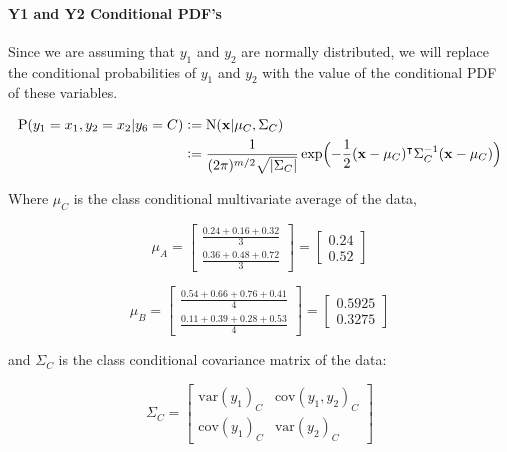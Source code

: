 \documentclass[12pt]{article}
\begin{document}
\begin{enumerate}[leftmargin=\labelsep]
\begin{enumerate}
        \paragraph{Y1 and Y2 Conditional PDF's}
        Since we are assuming that $y_1$ and $y_2$ are normally distributed, we will replace the conditional probabilities of $y_1$ and $y_2$ with the value of the conditional PDF of these variables.

        \begin{equation}
        \begin{split}
            \textrm{P}(y_1 = x_1, y_2 = x_2 | y_6 = C) &\vcentcolon= \textrm{N}(\mathbf{x} | \mu_C, \Sigma_C) \\
            &\vcentcolon= \frac{1}{(2\pi)^{m/2}\sqrt{|\Sigma_C|}}\exp\Bigl(-\frac{1}{2}(\mathbf{x}-\mu_C)^\intercal \Sigma_C^{-1} (\mathbf{x}-\mu_C)\Bigr)
        \end{split}
        \end{equation}

        Where $\mu_C$ is the class conditional multivariate average of the data,

        \begin{equation}
        \mu_A = \begin{bmatrix}
            \frac{0.24 + 0.16 + 0.32}{3} \\
            \frac{0.36 + 0.48 + 0.72}{3}
        \end{bmatrix} = \begin{bmatrix}
            0.24 \\
            0.52
        \end{bmatrix}
        \end{equation}

        \begin{equation}
            \mu_B =
            \begin{bmatrix}
                \frac{0.54 + 0.66 + 0.76 + 0.41}{4} \\
                \frac{0.11 + 0.39 + 0.28 + 0.53}{4}
            \end{bmatrix} =
            \begin{bmatrix}
                0.5925 \\
                0.3275
            \end{bmatrix}
        \end{equation}

        and $\Sigma_C$ is the class conditional covariance matrix of the data:

        \begin{equation}
            \Sigma_C =
            \begin{bmatrix}
                \textrm{var}(y_1)_C & \textrm{cov}(y_1, y_2)_C \\
                \textrm{cov}(y_1)_C & \textrm{var}(y_2)_C
            \end{bmatrix} 
        \end{equation}


\end{enumerate}
\end{enumerate}
\end{document}
